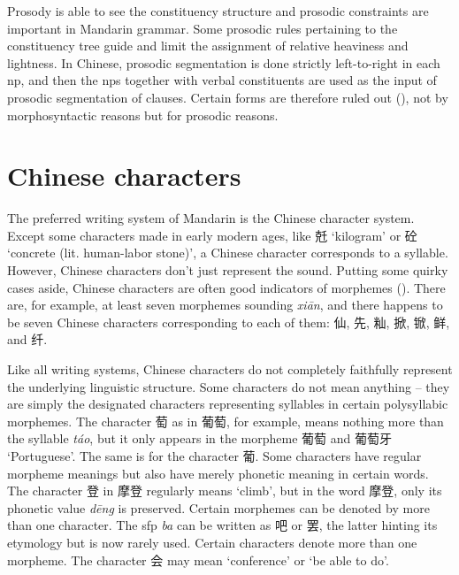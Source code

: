 \documentclass[UTF8, a4paper, oneside, scheme=plain]{ctexrep}
\newcommand{\corpus}[1]{\emph{#1}}
\newcommand{\translate}[1]{`#1'}
\begin{document}
Prosody is able to see the constituency structure
and prosodic constraints are important in Mandarin grammar.
Some prosodic rules pertaining to the constituency tree 
guide and limit the assignment of relative heaviness and lightness.
In Chinese, prosodic segmentation is done strictly left-to-right 
in each \ac{np},
and then the \ac{np}s together with verbal constituents 
are used as the input of prosodic segmentation of clauses.
Certain forms are therefore ruled out
(), 
not by morphosyntactic reasons but for prosodic reasons.

\section{Chinese characters}\label{sec:chinese-character}

The preferred writing system of Mandarin is the Chinese character system.
Except some characters made in early modern ages,
like 兛 \translate{kilogram} or 砼 \translate{concrete (lit. human-labor stone)},
a Chinese character corresponds to a syllable.
However, Chinese characters don't just represent the sound.
Putting some quirky cases aside,
Chinese characters are often good indicators of morphemes
().
There are, for example, at least seven morphemes sounding \corpus{xi\={a}n},
and there happens to be seven Chinese characters corresponding to each of them:
仙, 先, 籼, 掀, 锨, 鲜, and 纤.

Like all writing systems, 
Chinese characters do not completely faithfully represent 
the underlying linguistic structure.
Some characters do not mean anything -- 
they are simply the designated characters representing syllables 
in certain polysyllabic morphemes.
The character 萄 as in 葡萄, for example, 
means nothing more than the syllable \corpus{t\'{a}o},
but it only appears in the morpheme 葡萄 and 葡萄牙 \translate{Portuguese}.
The same is for the character 葡.
Some characters have regular morpheme meanings
but also have merely phonetic meaning in certain words.
The character 登 in 摩登 regularly means \translate{climb},
but in the word 摩登, only its phonetic value \corpus{d\={e}ng} is preserved.
Certain morphemes can be denoted by more than one character.
The \ac{sfp} \corpus{ba} can be written as 吧 or 罢,
the latter hinting its etymology but is now rarely used.
Certain characters denote more than one morpheme.
The character 会 may mean \translate{conference} or \translate{be able to do}. 
\end{document}
